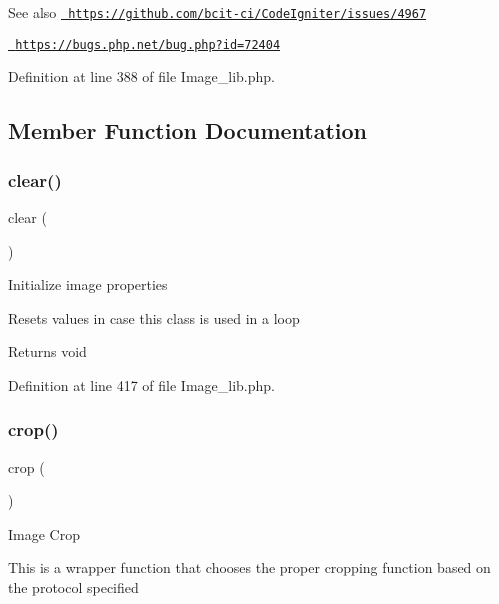 \begin{DoxySeeAlso}{See also}
\href{https://github.com/bcit-ci/CodeIgniter/issues/4967}{\texttt{ https\+://github.\+com/bcit-\/ci/\+Code\+Igniter/issues/4967}} 

\href{https://bugs.php.net/bug.php?id=72404}{\texttt{ https\+://bugs.\+php.\+net/bug.\+php?id=72404}}
\end{DoxySeeAlso}


Definition at line 388 of file Image\+\_\+lib.\+php.



\subsection{Member Function Documentation}
\mbox{\label{class_c_i___image__lib_aa821bec12eaa7e0f649397c9675ff505}} 
\subsubsection{\texorpdfstring{clear()}{clear()}}
{\footnotesize\ttfamily clear (\begin{DoxyParamCaption}{ }\end{DoxyParamCaption})}

Initialize image properties

Resets values in case this class is used in a loop

\begin{DoxyReturn}{Returns}
void 
\end{DoxyReturn}


Definition at line 417 of file Image\+\_\+lib.\+php.

\mbox{\label{class_c_i___image__lib_a77248c0134d1b117eb36774ecee6e04c}} 
\subsubsection{\texorpdfstring{crop()}{crop()}}
{\footnotesize\ttfamily crop (\begin{DoxyParamCaption}{ }\end{DoxyParamCaption})}

Image Crop

This is a wrapper function that chooses the proper cropping function based on the protocol specified


